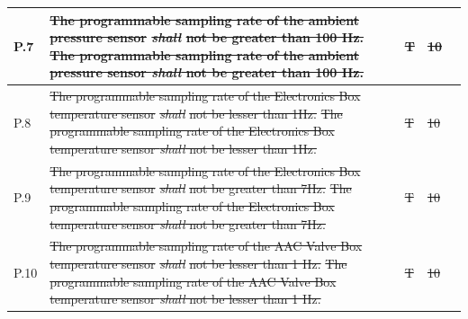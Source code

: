 \documentclass[a4paper,12pt,twoside]{article}
\providecommand{\DIFaddtex}[1]{{\protect\color{blue}\uwave{#1}}} %
\providecommand{\DIFdeltex}[1]{{\protect\color{red}\sout{#1}}}                      %
\providecommand{\DIFaddbegin}{} %
\providecommand{\DIFaddend}{} %
\providecommand{\DIFdelbegin}{} %
\providecommand{\DIFdelend}{} %
\providecommand{\DIFadd}[1]{\texorpdfstring{\DIFaddtex{#1}}{#1}} %
\providecommand{\DIFdel}[1]{\texorpdfstring{\DIFdeltex{#1}}{}} %
\newcommand{\DIFscaledelfig}{0.5}
\newlength{\DIFdelgraphicswidth} %
\newlength{\DIFdelgraphicsheight} %
\newcommand{\DIFaddincludegraphics}[2][]{{\color{blue}\fbox{\DIFOincludegraphics[#1]{#2}}}} %
\newcommand{\DIFdelincludegraphics}[2][]{%
\sbox{\DIFdelgraphicsbox}{\DIFOincludegraphics[#1]{#2}}%
\settoboxwidth{\DIFdelgraphicswidth}{\DIFdelgraphicsbox} %
\settoboxtotalheight{\DIFdelgraphicsheight}{\DIFdelgraphicsbox} %
\scalebox{\DIFscaledelfig}{%
\parbox[b]{\DIFdelgraphicswidth}{\usebox{\DIFdelgraphicsbox}\\[-\baselineskip] \rule{\DIFdelgraphicswidth}{0em}}\llap{\resizebox{\DIFdelgraphicswidth}{\DIFdelgraphicsheight}{%
\setlength{\unitlength}{\DIFdelgraphicswidth}%
\begin{picture}(1,1)%
\thicklines\linethickness{2pt} %
{\color[rgb]{1,0,0}\put(0,0){\framebox(1,1){}}}%
{\color[rgb]{1,0,0}\put(0,0){\line( 1,1){1}}}%
{\color[rgb]{1,0,0}\put(0,1){\line(1,-1){1}}}%
\end{picture}%
}\hspace*{3pt}}} %
} %
\DeclareRobustCommand{\DIFaddbegin}{\DIFOaddbegin \let\includegraphics\DIFaddincludegraphics} %
\DeclareRobustCommand{\DIFaddend}{\DIFOaddend \let\includegraphics\DIFOincludegraphics} %
\DeclareRobustCommand{\DIFdelbegin}{\DIFOdelbegin \let\includegraphics\DIFdelincludegraphics} %
\DeclareRobustCommand{\DIFdelend}{\DIFOaddend \let\includegraphics\DIFOincludegraphics} %
\begin{document}
\begin{longtable}[]{|m{}| m{} |m{} |m{}|m{}|}
P.7  & \DIFdelbegin \DIFdel{The programmable sampling rate of the ambient pressure sensor }\textit{\DIFdel{shall}} %
\DIFdel{not be greater than 100 Hz.                                                                         }\DIFdelend \DIFaddbegin \st{The programmable sampling rate of the ambient pressure sensor \textit{shall} not be greater than 100 Hz.}\DIFadd{\textsuperscript{\ref{replaceSoftVeri}}                                                                         }\DIFaddend &       \DIFdelbegin \DIFdel{T       }\DIFdelend \DIFaddbegin \DIFadd{-     }\DIFaddend & \DIFdelbegin \DIFdel{10            }\DIFdelend \DIFaddbegin \DIFadd{-           }\DIFaddend &        \\ \hline
P.8  & \DIFdelbegin \DIFdel{The programmable sampling rate of the Electronics Box temperature sensor }\textit{\DIFdel{shall}} %
\DIFdel{not be lesser than 1Hz.                                                                          }\DIFdelend \DIFaddbegin \st{The programmable sampling rate of the Electronics Box temperature sensor \textit{shall} not be lesser than 1Hz.}\DIFadd{\textsuperscript{\ref{replaceSoftVeri}}                                                                          }\DIFaddend &       \DIFdelbegin \DIFdel{T       }\DIFdelend \DIFaddbegin \DIFadd{-       }\DIFaddend & \DIFdelbegin \DIFdel{10            }\DIFdelend \DIFaddbegin \DIFadd{-            }\DIFaddend &        \\ \hline
P.9  & \DIFdelbegin \DIFdel{The programmable sampling rate of the Electronics Box temperature sensor }\textit{\DIFdel{shall}} %
\DIFdel{not be greater than 7Hz.                                                                         }\DIFdelend \DIFaddbegin \st{The programmable sampling rate of the Electronics Box temperature sensor \textit{shall} not be greater than 7Hz. }\DIFadd{\textsuperscript{\ref{replaceSoftVeri}}                                                                        }\DIFaddend &        \DIFdelbegin \DIFdel{T      }\DIFdelend \DIFaddbegin \DIFadd{-    }\DIFaddend & \DIFdelbegin \DIFdel{10            }\DIFdelend \DIFaddbegin \DIFadd{-        }\DIFaddend &        \\ \hline
P.10 & \DIFdelbegin \DIFdel{The programmable sampling rate of the AAC Valve Box temperature sensor }\textit{\DIFdel{shall}} %
\DIFdel{not be lesser than 1 Hz.                                                                   }\DIFdelend \DIFaddbegin \st{The programmable sampling rate of the AAC Valve Box temperature sensor \textit{shall} not be lesser than 1 Hz. }\DIFadd{\textsuperscript{\ref{replaceSoftVeri}}                                                                  }\DIFaddend & \DIFdelbegin \DIFdel{T      }\DIFdelend \DIFaddbegin \DIFadd{-    }\DIFaddend & \DIFdelbegin \DIFdel{10            }\DIFdelend \DIFaddbegin \DIFadd{-        }\DIFaddend &        \\ \hline

\end{longtable}
\end{document}
